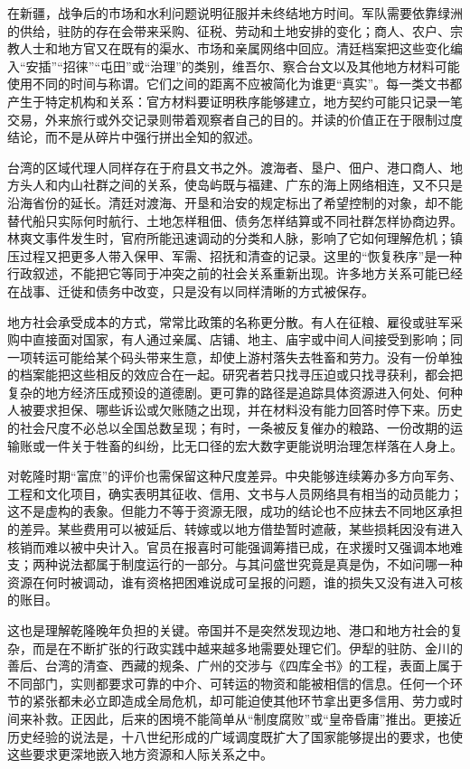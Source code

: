 在新疆，战争后的市场和水利问题说明征服并未终结地方时间。军队需要依靠绿洲的供给，驻防的存在会带来采购、征税、劳动和土地安排的变化；商人、农户、宗教人士和地方官又在既有的渠水、市场和亲属网络中回应。清廷档案把这些变化编入“安插”“招徕”“屯田”或“治理”的类别，维吾尔、察合台文以及其他地方材料可能使用不同的时间与称谓。它们之间的距离不应被简化为谁更“真实”。每一类文书都产生于特定机构和关系：官方材料要证明秩序能够建立，地方契约可能只记录一笔交易，外来旅行或外交记录则带着观察者自己的目的。并读的价值正在于限制过度结论，而不是从碎片中强行拼出全知的叙述。

台湾的区域代理人同样存在于府县文书之外。渡海者、垦户、佃户、港口商人、地方头人和内山社群之间的关系，使岛屿既与福建、广东的海上网络相连，又不只是沿海省份的延长。清廷对渡海、开垦和治安的规定标出了希望控制的对象，却不能替代船只实际何时航行、土地怎样租佃、债务怎样结算或不同社群怎样协商边界。林爽文事件发生时，官府所能迅速调动的分类和人脉，影响了它如何理解危机；镇压过程又把更多人带入保甲、军需、招抚和清查的记录。这里的“恢复秩序”是一种行政叙述，不能把它等同于冲突之前的社会关系重新出现。许多地方关系可能已经在战事、迁徙和债务中改变，只是没有以同样清晰的方式被保存。

地方社会承受成本的方式，常常比政策的名称更分散。有人在征粮、雇役或驻军采购中直接面对国家，有人通过亲属、店铺、地主、庙宇或中间人间接受到影响；同一项转运可能给某个码头带来生意，却使上游村落失去牲畜和劳力。没有一份单独的档案能把这些相反的效应合在一起。研究者若只找寻压迫或只找寻获利，都会把复杂的地方经济压成预设的道德剧。更可靠的路径是追踪具体资源进入何处、何种人被要求担保、哪些诉讼或欠账随之出现，并在材料没有能力回答时停下来。历史的社会尺度不必总以全国总数呈现；有时，一条被反复催办的粮路、一份改期的运输账或一件关于牲畜的纠纷，比无口径的宏大数字更能说明治理怎样落在人身上。

对乾隆时期“富庶”的评价也需保留这种尺度差异。中央能够连续筹办多方向军务、工程和文化项目，确实表明其征收、信用、文书与人员网络具有相当的动员能力；这不是虚构的表象。但能力不等于资源无限，成功的结论也不应抹去不同地区承担的差异。某些费用可以被延后、转嫁或以地方借垫暂时遮蔽，某些损耗因没有进入核销而难以被中央计入。官员在报喜时可能强调筹措已成，在求援时又强调本地难支；两种说法都属于制度运行的一部分。与其问盛世究竟是真是伪，不如问哪一种资源在何时被调动，谁有资格把困难说成可呈报的问题，谁的损失又没有进入可核的账目。

这也是理解乾隆晚年负担的关键。帝国并不是突然发现边地、港口和地方社会的复杂，而是在不断扩张的行政实践中越来越多地需要处理它们。伊犁的驻防、金川的善后、台湾的清查、西藏的规条、广州的交涉与《四库全书》的工程，表面上属于不同部门，实则都要求可靠的中介、可转运的物资和能被相信的信息。任何一个环节的紧张都未必立即造成全局危机，却可能迫使其他环节拿出更多信用、劳力或时间来补救。正因此，后来的困境不能简单从“制度腐败”或“皇帝昏庸”推出。更接近历史经验的说法是，十八世纪形成的广域调度既扩大了国家能够提出的要求，也使这些要求更深地嵌入地方资源和人际关系之中。

